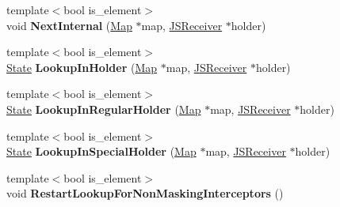 \begin{DoxyCompactItemize}
\item 
{\footnotesize template$<$bool is\+\_\+element$>$ }\\void {\bfseries Next\+Internal} (\hyperlink{classv8_1_1internal_1_1_map}{Map} $\ast$map, \hyperlink{classv8_1_1internal_1_1_j_s_receiver}{J\+S\+Receiver} $\ast$holder)\hypertarget{classv8_1_1internal_1_1_b_a_s_e___e_m_b_e_d_d_e_d_a1fce822df5b327892ab610cfc49c6994}{}\label{classv8_1_1internal_1_1_b_a_s_e___e_m_b_e_d_d_e_d_a1fce822df5b327892ab610cfc49c6994}

\item 
{\footnotesize template$<$bool is\+\_\+element$>$ }\\\hyperlink{structv8_1_1internal_1_1_b_a_s_e___e_m_b_e_d_d_e_d_1_1_state}{State} {\bfseries Lookup\+In\+Holder} (\hyperlink{classv8_1_1internal_1_1_map}{Map} $\ast$map, \hyperlink{classv8_1_1internal_1_1_j_s_receiver}{J\+S\+Receiver} $\ast$holder)\hypertarget{classv8_1_1internal_1_1_b_a_s_e___e_m_b_e_d_d_e_d_a80a43d96f62a93ac86807d1ef2f607eb}{}\label{classv8_1_1internal_1_1_b_a_s_e___e_m_b_e_d_d_e_d_a80a43d96f62a93ac86807d1ef2f607eb}

\item 
{\footnotesize template$<$bool is\+\_\+element$>$ }\\\hyperlink{structv8_1_1internal_1_1_b_a_s_e___e_m_b_e_d_d_e_d_1_1_state}{State} {\bfseries Lookup\+In\+Regular\+Holder} (\hyperlink{classv8_1_1internal_1_1_map}{Map} $\ast$map, \hyperlink{classv8_1_1internal_1_1_j_s_receiver}{J\+S\+Receiver} $\ast$holder)\hypertarget{classv8_1_1internal_1_1_b_a_s_e___e_m_b_e_d_d_e_d_a3f8e8429e31a2a2864c7eb4a577f4f81}{}\label{classv8_1_1internal_1_1_b_a_s_e___e_m_b_e_d_d_e_d_a3f8e8429e31a2a2864c7eb4a577f4f81}

\item 
{\footnotesize template$<$bool is\+\_\+element$>$ }\\\hyperlink{structv8_1_1internal_1_1_b_a_s_e___e_m_b_e_d_d_e_d_1_1_state}{State} {\bfseries Lookup\+In\+Special\+Holder} (\hyperlink{classv8_1_1internal_1_1_map}{Map} $\ast$map, \hyperlink{classv8_1_1internal_1_1_j_s_receiver}{J\+S\+Receiver} $\ast$holder)\hypertarget{classv8_1_1internal_1_1_b_a_s_e___e_m_b_e_d_d_e_d_a148e3abe374f768c74fa35d61370a7f7}{}\label{classv8_1_1internal_1_1_b_a_s_e___e_m_b_e_d_d_e_d_a148e3abe374f768c74fa35d61370a7f7}

\item 
{\footnotesize template$<$bool is\+\_\+element$>$ }\\void {\bfseries Restart\+Lookup\+For\+Non\+Masking\+Interceptors} ()\hypertarget{classv8_1_1internal_1_1_b_a_s_e___e_m_b_e_d_d_e_d_ae40b768308e5ac46558f6f5ddddf2225}{}\label{classv8_1_1internal_1_1_b_a_s_e___e_m_b_e_d_d_e_d_ae40b768308e5ac46558f6f5ddddf2225}


\end{DoxyCompactItemize}

